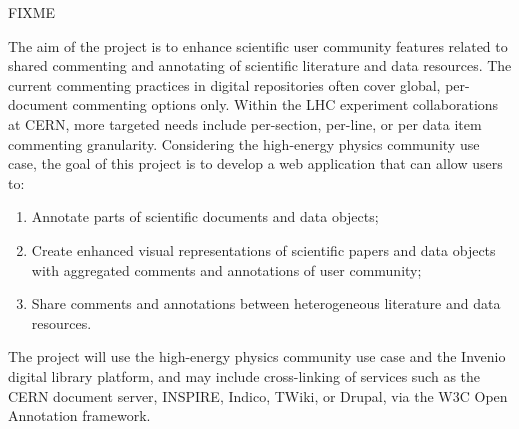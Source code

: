 
FIXME

The aim of the project is to enhance scientific user community features related
to shared commenting and annotating of scientific literature and data
resources.  The current commenting practices in digital repositories often
cover global, per-document commenting options only. Within the LHC experiment
collaborations at CERN, more targeted needs include per-section, per-line, or
per data item commenting granularity. Considering the high-energy physics
community use case, the goal of this project is to develop a web application
that can allow users to:

\begin{enumerate}
  \item Annotate parts of scientific documents and data objects;
  \item Create enhanced visual representations of scientific papers and data
        objects with aggregated comments and annotations of user community;
  \item Share comments and annotations between heterogeneous literature and data
        resources.
\end{enumerate}

The project will use the high-energy physics community use case and the Invenio
digital library platform, and may include cross-linking of services such as the
CERN document server, INSPIRE, Indico, TWiki, or Drupal, via the W3C Open
Annotation framework.
